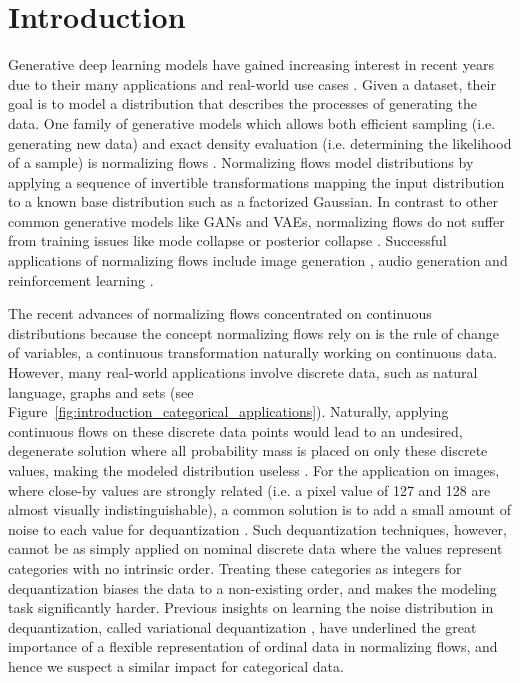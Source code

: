 \vspace*{0cm}
\section{Introduction}
\label{sec:introduction}

Generative deep learning models have gained increasing interest in recent years due to their many applications and real-world use cases \cite{Goodfellow2014GenerativeNets, StyleGAN, BigGAN, VAE, VQVAE2, NVAE}. 
Given a dataset, their goal is to model a distribution that describes the processes of generating the data.
One family of generative models which allows both efficient sampling (i.e. generating new data) and exact density evaluation (i.e. determining the likelihood of a sample) is normalizing flows \cite{NormalizingFlowsFundamentals, NormalizingFlowsOriginalMathConcept}. 
Normalizing flows model distributions by applying a sequence of invertible transformations mapping the input distribution to a known base distribution such as a factorized Gaussian. 
In contrast to other common generative models like \acp{GAN} and \acp{VAE}, normalizing flows do not suffer from training issues like mode collapse or posterior collapse \cite{VAEPosteriorCollapse, StyleGAN, NormalizingFlowsOverview}. 
Successful applications of normalizing flows include image generation \cite{RealNVP, Glow, Flow++, IntegerNF}, audio generation \cite{FloWaveNet, Waveglow} and reinforcement learning \cite{NFReinforcementLearning1, NFReinforcementLearning2}.

The recent advances of normalizing flows concentrated on continuous distributions because the concept normalizing flows rely on is the rule of change of variables, a continuous transformation naturally working on continuous data.
However, many real-world applications involve discrete data, such as natural language, graphs and sets (see Figure~\ref{fig:introduction_categorical_applications}). 
Naturally, applying continuous flows on these discrete data points would lead to an undesired, degenerate solution where all probability mass is placed on only these discrete values, making the modeled distribution useless \cite{UriaContPeaks, Theis2015}. 
For the application on images, where close-by values are strongly related (i.e. a pixel value of 127 and 128 are almost visually indistinguishable), a common solution is to add a small amount of noise to each value for dequantization \cite{RealNVP, Flow++}.
Such dequantization techniques, however, cannot be as simply applied on nominal discrete data where the values represent categories with no intrinsic order. 
Treating these categories as integers for dequantization
biases the data to a non-existing order, and makes the modeling task significantly harder. 
Previous insights on learning the noise distribution in dequantization, called variational dequantization \cite{Flow++, EmielDequantization}, have underlined the great importance of a flexible representation of ordinal data in normalizing flows, and hence we suspect a similar impact for categorical data.

